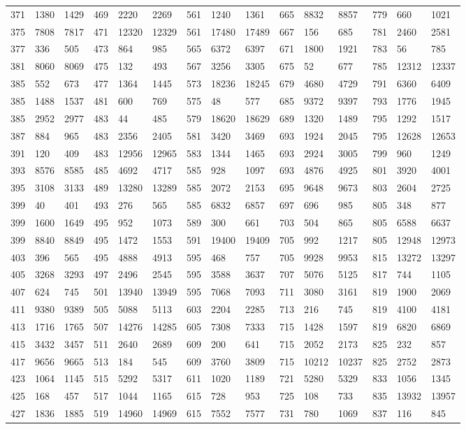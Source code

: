 \begin{longtable}{*4{A@{\hspace*{5mm}}A}}
	371&1380&1429&469&2220&2269&561&1240&1361&665&8832&8857&779&660&1021\\
	375&7808&7817&471&12320&12329&561&17480&17489&667&156&685&781&2460&2581\\
	377&336&505&473&864&985&565&6372&6397&671&1800&1921&783&56&785\\
	381&8060&8069&475&132&493&567&3256&3305&675&52&677&785&12312&12337\\
	385&552&673&477&1364&1445&573&18236&18245&679&4680&4729&791&6360&6409\\
	385&1488&1537&481&600&769&575&48&577&685&9372&9397&793&1776&1945\\
	385&2952&2977&483&44&485&579&18620&18629&689&1320&1489&795&1292&1517\\
	387&884&965&483&2356&2405&581&3420&3469&693&1924&2045&795&12628&12653\\
	391&120&409&483&12956&12965&583&1344&1465&693&2924&3005&799&960&1249\\
	393&8576&8585&485&4692&4717&585&928&1097&693&4876&4925&801&3920&4001\\
	395&3108&3133&489&13280&13289&585&2072&2153&695&9648&9673&803&2604&2725\\
	399&40&401&493&276&565&585&6832&6857&697&696&985&805&348&877\\
	399&1600&1649&495&952&1073&589&300&661&703&504&865&805&6588&6637\\
	399&8840&8849&495&1472&1553&591&19400&19409&705&992&1217&805&12948&12973\\
	403&396&565&495&4888&4913&595&468&757&705&9928&9953&815&13272&13297\\
	405&3268&3293&497&2496&2545&595&3588&3637&707&5076&5125&817&744&1105\\
	407&624&745&501&13940&13949&595&7068&7093&711&3080&3161&819&1900&2069\\
	411&9380&9389&505&5088&5113&603&2204&2285&713&216&745&819&4100&4181\\
	413&1716&1765&507&14276&14285&605&7308&7333&715&1428&1597&819&6820&6869\\
	415&3432&3457&511&2640&2689&609&200&641&715&2052&2173&825&232&857\\
	417&9656&9665&513&184&545&609&3760&3809&715&10212&10237&825&2752&2873\\
	423&1064&1145&515&5292&5317&611&1020&1189&721&5280&5329&833&1056&1345\\
	425&168&457&517&1044&1165&615&728&953&725&108&733&835&13932&13957\\
	427&1836&1885&519&14960&14969&615&7552&7577&731&780&1069&837&116&845\\

\end{longtable}
